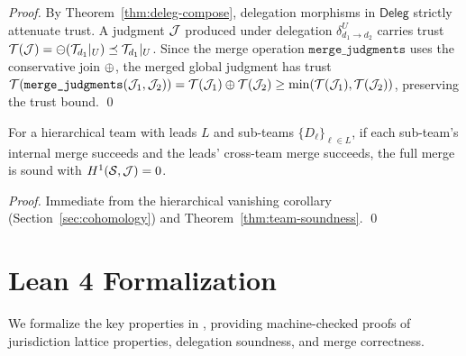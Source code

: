 \documentclass[11pt]{article}
\newcommand{\MergeOp}{\texttt{merge\_judgments}}
\newcommand{\DelegCat}{\mathsf{Deleg}}
\begin{document}
\begin{proof}
By Theorem~\ref{thm:deleg-compose}, delegation morphisms in $\DelegCat$
strictly attenuate trust. A judgment $\mathcal{J}$ produced under delegation
$\delta_{d_1 \to d_2}^U$ carries trust
$\mathcal{T}(\mathcal{J}) = \ominus(\mathcal{T}_{d_1}|_U) \preceq \mathcal{T}_{d_1}|_U$.
Since the merge operation $\MergeOp$ uses the conservative join $\oplus$,
the merged global judgment has trust
$\trust(\MergeOp(\J_1, \J_2)) = \trust(\J_1) \tjoin \trust(\J_2) \geq
\min(\trust(\J_1), \trust(\J_2))$,
preserving the trust bound. \qed
\end{proof}

\begin{corollary}
For a hierarchical team with leads $L$ and sub-teams
$\{D_\ell\}_{\ell \in L}$, if each sub-team's internal merge succeeds and
the leads' cross-team merge succeeds, the full merge is sound with
$H^{1}(\mathcal{S}, \mathcal{J}) = 0$.
\end{corollary}

\begin{proof}
Immediate from the hierarchical vanishing corollary
(Section~\ref{sec:cohomology}) and Theorem~\ref{thm:team-soundness}. \qed
\end{proof}

\section{Lean 4 Formalization}\label{sec:lean}

We formalize the key properties in \LEAN, providing machine-checked proofs of
jurisdiction lattice properties, delegation soundness, and merge correctness.
\end{document}
